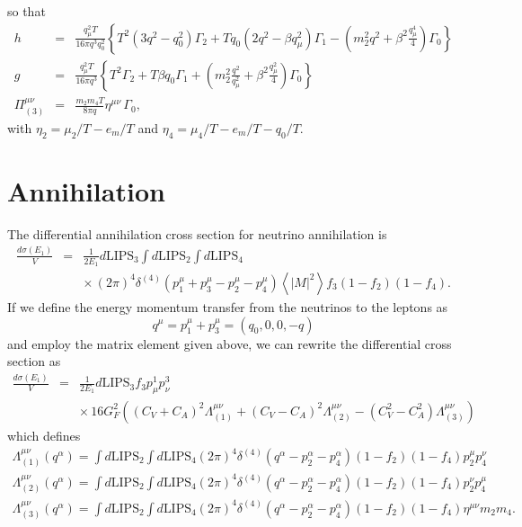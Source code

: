 \documentclass[12pt,letter]{article}
\begin{document}
so that 
\begin{eqnarray}
h &=& \frac{q_\mu^2 T}{16 \pi q^3 q_0^2} 
\left\{T^2 (3 q^2-q_0^2) \Gamma_2 + T q_0(2 q^2 - \beta q_\mu^2) \Gamma_1 
- \left (m_2^2 q^2 + \beta^2 \frac{q^4_\mu}{4} \right) \Gamma_0 \right\} \\
g &=& \frac{q_\mu^2 T}{16 \pi q^3}
\left\{T^2 \Gamma_2 + T  \beta q_0 \Gamma_1
+ \left( m_2^2 \frac{q^2}{q_\mu^2} 
+ \beta^2 \frac{q^2_\mu}{4} \right) \Gamma_0  \right\} \\
\Pi^{\mu \nu}_{(3)} &=& \frac{m_2 m_4 T}{8 \pi q} \eta^{\mu \nu} \, \Gamma_0,
\end{eqnarray}
with $\eta_2 = \mu_2/T - e_m/T$ and $\eta_4 = \mu_4/T - e_m/T - q_0/T$.



\section{Annihilation}
The differential annihilation cross section for neutrino annihilation is 
\begin{eqnarray*}
\frac{d \sigma(E_1)}{V} &=& \frac{1}{2 E_1} d\textrm{LIPS}_3 \int d\textrm{LIPS}_2 
\int d\textrm{LIPS}_4 \\
&& \times \, (2 \pi)^4 \delta^{(4)}\left(p^\mu_1 + p^\mu_3 - p^\mu_2 - p^\mu_4 \right)
\left\langle \left| M \right|^2 \right \rangle f_3 (1-f_2)(1-f_4).
\end{eqnarray*}
If we define the energy momentum transfer from the neutrinos to the leptons as
\begin{equation*}
q^\mu = p_1^\mu + p_3^\mu = (q_0,0,0,-q)
\end{equation*}
and employ the matrix element given above, we can rewrite the differential cross section as 
\begin{eqnarray*}
\frac{d \sigma(E_1)}{V} &=& \frac{1}{2 E_1}  d\textrm{LIPS}_3 f_3 
p^1_\mu p^3_\nu \\
&&\times \, 16 G_F^2\left( 
 (C_V+C_A)^2 \Lambda_{(1)}^{\mu \nu}
+(C_V-C_A)^2 \Lambda_{(2)}^{\mu \nu}
-(C_V^2-C_A^2) \Lambda_{(3)}^{\mu \nu} \right)
\end{eqnarray*}
which defines 
\begin{eqnarray*}
\Lambda_{(1)}^{\mu \nu}(q^\alpha) = \int d\textrm{LIPS}_2 \int d\textrm{LIPS}_4
(2 \pi)^4 \delta^{(4)}\left(q^\alpha - p^\alpha_2 - p^\alpha_4 \right) 
(1-f_2)(1-f_4)p^\mu_2 p^\nu_4 \nonumber\\
\Lambda_{(2)}^{\mu \nu}(q^\alpha) = \int d\textrm{LIPS}_2 \int d\textrm{LIPS}_4
(2 \pi)^4 \delta^{(4)}\left(q^\alpha - p^\alpha_2 - p^\alpha_4 \right) 
(1-f_2)(1-f_4) p^\nu_2 p^\mu_4 \nonumber\\
\Lambda_{(3)}^{\mu \nu}(q^\alpha) = \int d\textrm{LIPS}_2 \int d\textrm{LIPS}_4
(2 \pi)^4 \delta^{(4)}\left(q^\alpha - p^\alpha_2 - p^\alpha_4 \right) 
(1-f_2)(1-f_4) \eta^{\mu \nu} m_2 m_4.
\end{eqnarray*}
\end{document}
